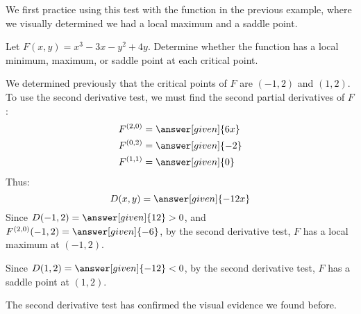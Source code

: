 \documentclass{ximera}
\begin{document}
We first practice using this test with the function in the previous
example, where we visually determined we had a local maximum and a
saddle point.

\begin{example}
  Let $F(x,y) = x^3-3x-y^2+4y$. Determine whether the function has a
  local minimum, maximum, or saddle point at each critical point.
  \begin{explanation}
    We determined previously that the critical points of $F$ are
    $(-1,2)$ and $(1,2)$. To use the second derivative test, we must
    find the second partial derivatives of $F$:
    \begin{align*}
      F^{(2,0)} &= \answer[given]{6x}\\
      F^{(0,2)} &= \answer[given]{-2}\\
      F^{(1,1)} &= \answer[given]{0}
    \end{align*}
    Thus:
    \[
    D(x,y) = \answer[given]{-12x}
    \]
    Since $D(-1,2) = \answer[given]{12}>0$, and $F^{(2,0)}(-1,2) =
    \answer[given]{-6}$, by the second derivative test, $F$ has a
    local maximum at $(-1,2)$.
    
    Since $D(1,2) = \answer[given]{-12} <0$, by the second derivative test, $F$ has a saddle point at $(1,2)$.
    
    The second derivative test has confirmed the visual evidence we
    found before.
  \end{explanation}
\end{example}
\end{document}
